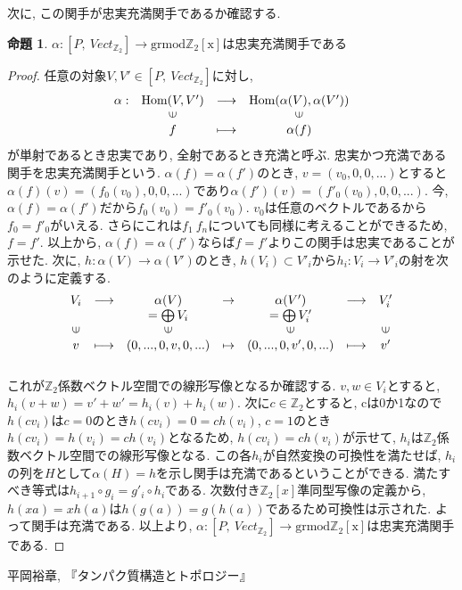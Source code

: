 \documentclass[a4paper]{jsarticle}
\theoremstyle{definition}
\newtheorem{prop}[dfn]{命題}
\newcommand{\Fun}[2]{[#1,~#2]}
\newcommand{\grmodZ}{{\mathrm{grmod \mathbb{Z}_2[x]}}}
\newcommand{\Hom}{{\mathrm{Hom}}}
\begin{document}
次に, この関手が忠実充満関手であるか確認する. 
\begin{prop}
    $\alpha:\Fun{P}{Vect_{\mathbb{Z}_2}}\rightarrow \grmodZ$は忠実充満関手である
\end{prop}
\begin{proof}
    任意の対象$V, V'\in\Fun{P}{Vect_{\mathbb{Z}_2}}$に対し, 
\begin{equation}
    \begin{array}{cccc}
         \alpha:& \Hom(V, V') & \longrightarrow & \Hom(\alpha(V), \alpha(V')) \\
        & \rotatebox{90}{$\in$} & & \rotatebox{90}{$\in$} \\
        & f & \longmapsto & \alpha(f)\notag
    \end{array}
\end{equation}
が単射であるとき忠実であり, 全射であるとき充満と呼ぶ. 忠実かつ充満である関手を忠実充満関手という. $\alpha(f)=\alpha(f')$のとき, $v=(v_0,0,0,...)$とすると$\alpha(f)(v)=(f_0(v_0),0,0,...)$であり$\alpha(f')(v)=(f'_0(v_0),0,0,...)$. 今, $\alpha(f)=\alpha(f')$だから$f_0(v_0)=f'_0(v_0)$. $v_0$は任意のベクトルであるから$f_0=f'_0$がいえる. さらにこれは$f_1~f_n$についても同様に考えることができるため, $f=f'$. 以上から, $\alpha(f)=\alpha(f')$ならば$f=f'$よりこの関手は忠実であることが示せた. 次に, $h:\alpha(V)\rightarrow \alpha(V')$のとき, $h(V_i)\subset V'_i$から$h_i:V_i\rightarrow V'_i$の射を次のように定義する.
\begin{equation}
    \begin{array}{ccccccc}
         V_i&\longrightarrow& \alpha(V) & \rightarrow & \alpha(V')& \longrightarrow&V'_i\\
         &              &  =\bigoplus V_i &             &    =\bigoplus V'_i     & &\\
       \rotatebox{90}{$\in$} & &\rotatebox{90}{$\in$} & & \rotatebox{90}{$\in$} & & \rotatebox{90}{$\in$}\\
        v& \longmapsto & (0,...,0,v,0,...) &\mapsto & (0,...,0,v',0,...)& \longmapsto & v'\\\notag
    \end{array}
\end{equation}
これが$\mathbb{Z}_2$係数ベクトル空間での線形写像となるか確認する. $v, w\in V_i$とすると, 
$h_i(v+w)=v'+w'=h_i(v)+h_i(w)$. 次に$c\in\mathbb{Z}_2$とすると, cは0か1なので$h(cv_i)$は$c=0$のとき$h(cv_i)=0=ch(v_i)$, $c=1$のとき$h(cv_i)=h(v_i)=ch(v_i)$となるため, $h(cv_i)=ch(v_i)$が示せて, $h_i$は$\mathbb{Z}_2$係数ベクトル空間での線形写像となる. この各$h_i$が自然変換の可換性を満たせば, $h_i$の列を$H$として$\alpha(H)=h$を示し関手は充満であるということができる. 満たすべき等式は$h_{i+1}\circ g_i=g'_i\circ h_{i}$である. 次数付き$\mathbb{Z}_2[x]$準同型写像の定義から, $h(xa)=xh(a)$は$h(g(a))=g(h(a))$であるため可換性は示された. よって関手は充満である. 以上より, $\alpha:\Fun{P}{Vect_{\mathbb{Z}_2}}\rightarrow \grmodZ$は忠実充満関手である.
\end{proof}


\begin{thebibliography}{9}
     平岡裕章, 『タンパク質構造とトポロジー』
\end{thebibliography}
\end{document}
